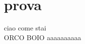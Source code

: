 \documentclass{article}
\begin{document}
    \section{prova}
        ciao come stai\\
        ORCO BOIO aaaaaaaaaa
\end{document}
